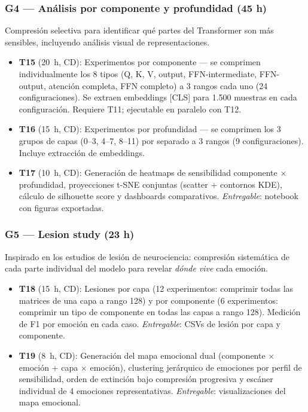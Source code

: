 \documentclass[11pt, a4paper]{article}
\begin{document}
\subsubsection{G4 --- Análisis por componente y profundidad (45 h)}

Compresión selectiva para identificar qué partes del Transformer son más sensibles, incluyendo análisis visual de representaciones.

\begin{itemize}[nosep, leftmargin=1.2em, itemsep=2pt]
    \item \textbf{T15} (20~h, CD): Experimentos por componente --- se comprimen individualmente los 8 tipos (Q, K, V, output, FFN-intermediate, FFN-output, atención completa, FFN completo) a 3 rangos cada uno (24 configuraciones). Se extraen embeddings [CLS] para 1.500 muestras en cada configuración. Requiere T11; ejecutable en paralelo con T12.
    \item \textbf{T16} (15~h, CD): Experimentos por profundidad --- se comprimen los 3 grupos de capas (0--3, 4--7, 8--11) por separado a 3 rangos (9 configuraciones). Incluye extracción de embeddings.
    \item \textbf{T17} (10~h, CD): Generación de heatmaps de sensibilidad componente $\times$ profundidad, proyecciones t-SNE conjuntas (scatter + contornos KDE), cálculo de silhouette score y dashboards comparativos. \textit{Entregable}: notebook con figuras exportadas.
\end{itemize}

\subsubsection{G5 --- Lesion study (23 h)}

Inspirado en los estudios de lesión de neurociencia: compresión sistemática de cada parte individual del modelo para revelar \textit{dónde vive} cada emoción.

\begin{itemize}[nosep, leftmargin=1.2em, itemsep=2pt]
    \item \textbf{T18} (15~h, CD): Lesiones por capa (12 experimentos: comprimir todas las matrices de una capa a rango 128) y por componente (6 experimentos: comprimir un tipo de componente en todas las capas a rango 128). Medición de F1 por emoción en cada caso. \textit{Entregable}: CSVs de lesión por capa y componente.
    \item \textbf{T19} (8~h, CD): Generación del mapa emocional dual (componente $\times$ emoción + capa $\times$ emoción), clustering jerárquico de emociones por perfil de sensibilidad, orden de extinción bajo compresión progresiva y escáner individual de 4 emociones representativas. \textit{Entregable}: visualizaciones del mapa emocional.
\end{itemize}
\end{document}
